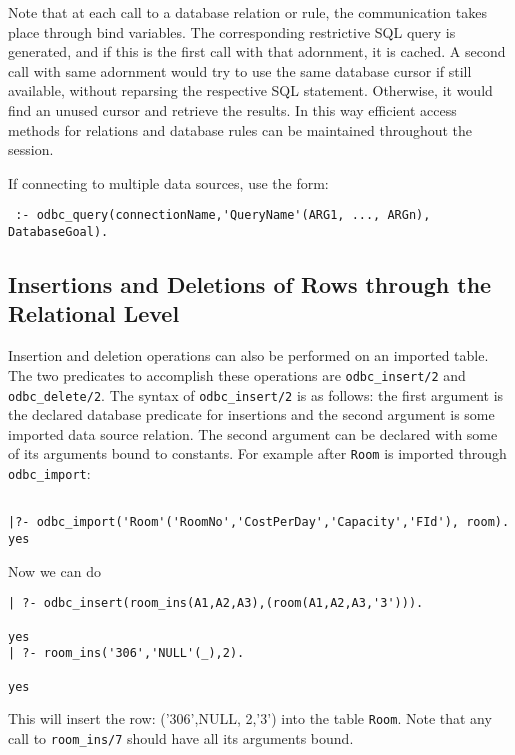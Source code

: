 Note that at each call to a database relation or rule, the
communication takes place through bind variables.  The corresponding
restrictive SQL query is generated, and if this is the first call with
that adornment, it is cached.  A second call with same adornment would
try to use the same database cursor if still available, without
reparsing the respective SQL statement.  Otherwise, it would find an
unused cursor and retrieve the results.  In this way efficient access
methods for relations and database rules can be maintained throughout
the session.

If connecting to multiple data sources, use the form:
\begin{verbatim}
 :- odbc_query(connectionName,'QueryName'(ARG1, ..., ARGn), DatabaseGoal).
\end{verbatim}


\subsection{Insertions and Deletions of Rows through the Relational Level}

Insertion and deletion operations can also be performed on an imported
table.  The two predicates to accomplish these operations are 
{\tt odbc\_insert/2} and {\tt odbc\_delete/2}.  The syntax of 
{\tt odbc\_insert/2} is as follows: the first argument is the declared 
database predicate for insertions and the second argument
is some imported data source relation.  The second argument can be 
declared with some of its arguments bound to constants.  For example 
after {\tt Room} is imported through {\tt odbc\_import}:
\begin{verbatim}

|?- odbc_import('Room'('RoomNo','CostPerDay','Capacity','FId'), room).
yes 
\end{verbatim}

Now we can do

\begin{verbatim}
| ?- odbc_insert(room_ins(A1,A2,A3),(room(A1,A2,A3,'3'))).

yes
| ?- room_ins('306','NULL'(_),2).

yes
\end{verbatim}
This will insert the row: ('306',NULL, 2,'3') into the table {\tt Room}. Note that 
any call to {\tt room\_ins/7} should have all its arguments bound.

